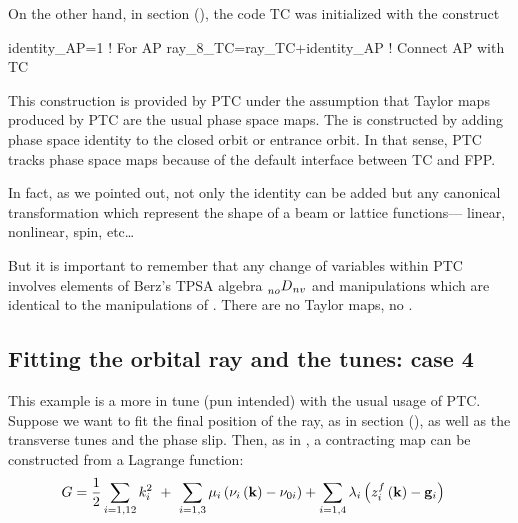 \documentclass{hitec}     %
\begin{document}
{{  On the other hand, in section (), the code TC was initialized with the construct
  

\begin{code}
identity_AP=1  !  For AP
ray_8_TC=ray_TC+identity_AP   ! Connect AP with TC
\end{code}

This construction is provided by PTC under the assumption that Taylor maps produced by PTC are the usual phase space maps. The  is constructed by adding phase space identity to the closed orbit or entrance orbit. In that sense, PTC  tracks phase space maps because of the default interface between TC and FPP.

In fact, as we pointed out, not only the identity  can be added but any canonical transformation which represent the shape of a beam or lattice functions--- linear, nonlinear, spin, etc\ldots

But it is important to remember that any change of variables within PTC involves elements of Berz's TPSA algebra $\prescript{}{no}{D}_{nv}$ and manipulations which are identical to the manipulations of . There are no Taylor maps, no .

 \subsection{Fitting the orbital ray and the tunes: case 4}\label{s:lagmapt}
 
 
 This example is a more in tune (pun intended) with the usual usage of PTC. Suppose we want to fit the final position of the ray, as in section (), as well as the transverse tunes and the phase slip.  Then, as in , a contracting map can be constructed from a Lagrange function:
%
\begin{align} G&={1 \over 2}\sum\limits_{i=
1,12}^{} {k}_{i}^{2}\ +\ \sum\limits_{i=
1,3}^{} {\mu }_{i}\left({{\nu }_{i}\left({{\bf k}}\right) - {\nu }_{0i}}\right)+\sum\limits_{i=
1,4}^{} {\lambda }_{i}\left({{z}_{i}^{f}\left({{\bf k}}\right) - {{\bf g}}_{i}}\right) \label{eq:langt}\end{align}


}}
\end{document}
